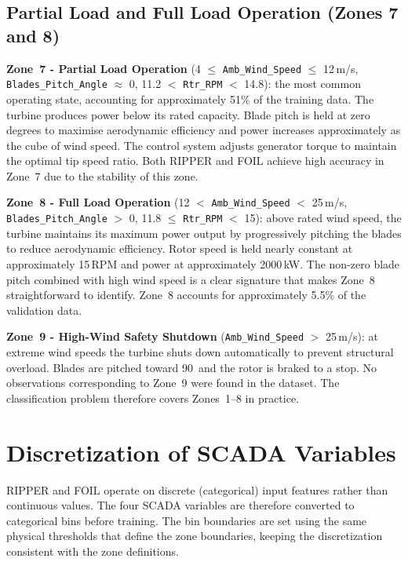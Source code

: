 \subsection{Partial Load and Full Load Operation (Zones 7 and 8)}
\label{subsec:ch3:zones:78}

\textbf{Zone~7 - Partial Load Operation}
(4 $\leq$ \texttt{Amb\_Wind\_Speed} $\leq$ 12\,m/s,
\texttt{Blades\_Pitch\_Angle} $\approx$ 0\textdegree,
11.2 $<$ \texttt{Rtr\_RPM} $<$ 14.8): the most common operating state, accounting for
approximately 51\% of the training data. The turbine produces power below its rated
capacity. Blade pitch is held at zero degrees to maximise aerodynamic efficiency and
power increases approximately as the cube of wind speed. The control system adjusts
generator torque to maintain the optimal tip speed ratio. Both RIPPER and FOIL achieve
high accuracy in Zone~7 due to the stability of this zone.

\textbf{Zone~8 - Full Load Operation}
(12 $<$ \texttt{Amb\_Wind\_Speed} $<$ 25\,m/s,
\texttt{Blades\_Pitch\_Angle} $>$ 0\textdegree,
11.8 $\leq$ \texttt{Rtr\_RPM} $<$ 15): above rated wind speed, the turbine maintains
its maximum power output by progressively pitching the blades to reduce aerodynamic
efficiency. Rotor speed is held nearly constant at approximately 15\,RPM and power at
approximately 2000\,kW. The non-zero blade pitch combined with high wind speed is a
clear signature that makes Zone~8 straightforward to identify. Zone~8 accounts for
approximately 5.5\% of the validation data.

\textbf{Zone~9 - High-Wind Safety Shutdown}
(\texttt{Amb\_Wind\_Speed} $>$ 25\,m/s): at extreme wind speeds the turbine shuts down
automatically to prevent structural overload. Blades are pitched toward 90\textdegree\
and the rotor is braked to a stop. No observations corresponding to Zone~9 were found in
the dataset. The classification problem therefore covers Zones~1--8 in practice.

\section{Discretization of SCADA Variables}
\label{sec:ch3:discretization}

RIPPER and FOIL operate on discrete (categorical) input features rather than continuous
values. The four SCADA variables are therefore converted to categorical bins before
training. The bin boundaries are set using the same physical thresholds that define the
zone boundaries, keeping the discretization consistent with the zone definitions.

